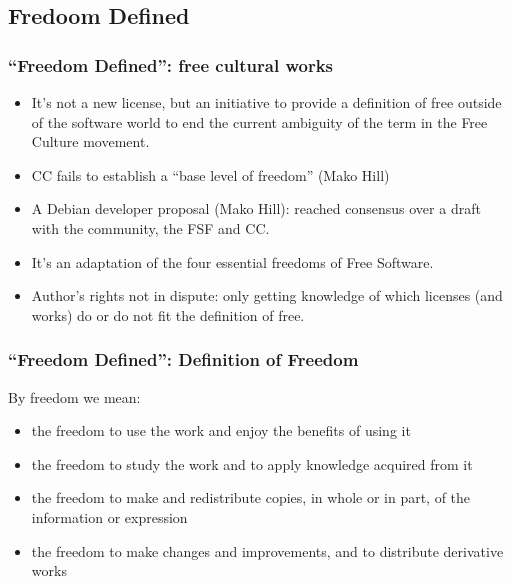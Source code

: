 \subsection{Fredoom Defined}

\begin{frame}
\frametitle{``Freedom Defined'': free cultural works}

\begin{itemize}
\item It's not a new license, but an initiative to provide a definition of \alert{free} outside of the software world to end the current ambiguity of the term in the Free Culture movement.
\item CC fails to establish a ``base level of freedom'' (Mako Hill)
\item A Debian developer proposal (Mako Hill): reached consensus over a draft with the community, the FSF and CC. 
\item It's an adaptation of the four essential freedoms of Free Software.
\item Author's rights not in dispute: only getting knowledge of which licenses (and works) do or do not fit the definition of \alert{free}.
\end{itemize}                                                 

\end{frame}



\begin{frame}
\frametitle{``Freedom Defined'': Definition of Freedom}

By \alert{freedom} we mean:

\begin{itemize}
\item the \alert{freedom to use} the work and enjoy the benefits of using it
\item the \alert{freedom to study} the work and to apply knowledge acquired from it
\item the \alert{freedom to make and redistribute copies}, in whole or in part, of the information or expression
\item the \alert{freedom to make changes and improvements}, and to distribute derivative works 
\end{itemize}                                                 

\end{frame}

